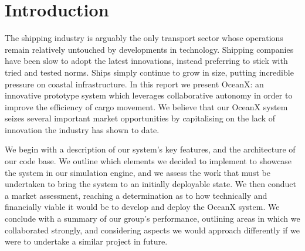 \section{Introduction}

The shipping industry is arguably the only transport sector whose operations remain relatively untouched by developments in technology. Shipping companies have been slow to adopt the latest innovations, instead preferring to stick with tried and tested norms. Ships simply continue to grow in size, putting incredible pressure on coastal infrastructure. In this report we present OceanX: an innovative prototype system which leverages collaborative autonomy in order to improve the efficiency of cargo movement. We believe that our OceanX system seizes several important market opportunities by capitalising on the lack of innovation the industry has shown to date.

We begin with a description of our system’s key features, and the architecture of our code base. We outline which elements we decided to implement to showcase the system in our simulation engine, and we assess the work that must be undertaken to bring the system to an initially deployable state. We then conduct a market assessment, reaching a determination as to how technically and financially viable it would be to develop and deploy the OceanX system. We conclude with a summary of our group’s performance, outlining areas in which we collaborated strongly, and considering aspects we would approach differently if we were to undertake a similar project in future.

